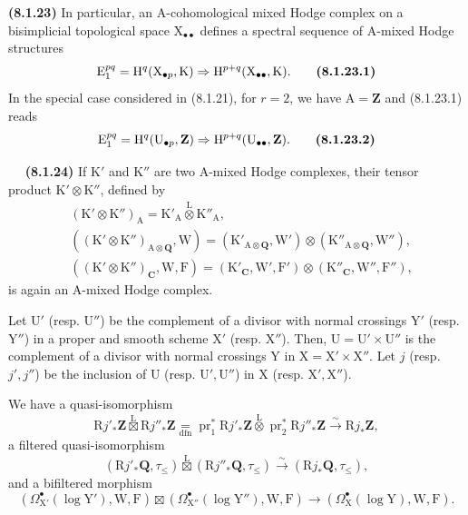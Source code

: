 \documentclass[11pt,leqno]{article}
\newcommand{\Page}[1]{\ifvmode\noindent\else\unskip\ \fi{\footnotesize\textcolor{gray}{[p.\,#1]}}\ \ignorespaces}
\begin{document}
\textbf{(8.1.23)} In particular, an \(\mathrm{A}\)-cohomological mixed Hodge complex on a bisimplicial topological space \(\mathrm{X}_{\bullet\bullet}\) defines a spectral sequence of \(\mathrm{A}\)-mixed Hodge structures
\[
\mathrm{E}_{1}^{pq}
=
\mathrm{H}^{q}(\mathrm{X}_{\bullet p},\mathrm{K})
\Rightarrow
\mathrm{H}^{p+q}(\mathrm{X}_{\bullet\bullet},\mathrm{K}).
\tag*{\textbf{(8.1.23.1)}}
\]
In the special case considered in (8.1.21), for \(r=2\), we have \(\mathrm{A}=\mathbf{Z}\) and (8.1.23.1) reads
\[
\mathrm{E}_{1}^{pq}
=
\mathrm{H}^{q}(\mathrm{U}_{\bullet p},\mathbf{Z})
\Rightarrow
\mathrm{H}^{p+q}(\mathrm{U}_{\bullet\bullet},\mathbf{Z}).
\tag*{\textbf{(8.1.23.2)}}
\]

\Page{37}
\textbf{(8.1.24)} If \(\mathrm{K}'\) and \(\mathrm{K}''\) are two \(\mathrm{A}\)-mixed Hodge complexes, their tensor product \(\mathrm{K}'\otimes\mathrm{K}''\), defined by
\[
\begin{aligned}
&(\mathrm{K}'\otimes\mathrm{K}'')_{\mathrm{A}}
 =\mathrm{K}'_{\mathrm{A}}\overset{\mathrm{L}}{\otimes}\mathrm{K}''_{\mathrm{A}},\\
&((\mathrm{K}'\otimes\mathrm{K}'')_{\mathrm{A}\otimes\mathbf{Q}},\mathrm{W})
 =(\mathrm{K}'_{\mathrm{A}\otimes\mathbf{Q}},\mathrm{W}')
 \otimes(\mathrm{K}''_{\mathrm{A}\otimes\mathbf{Q}},\mathrm{W}''),\\
&((\mathrm{K}'\otimes\mathrm{K}'')_{\mathbf{C}},\mathrm{W},\mathrm{F})
 =(\mathrm{K}'_{\mathbf{C}},\mathrm{W}',\mathrm{F}')
 \otimes(\mathrm{K}''_{\mathbf{C}},\mathrm{W}'',\mathrm{F}''),
\end{aligned}
\]
is again an \(\mathrm{A}\)-mixed Hodge complex.

Let \(\mathrm{U}'\) (resp. \(\mathrm{U}''\)) be the complement of a divisor with normal crossings \(\mathrm{Y}'\) (resp. \(\mathrm{Y}''\)) in a proper and smooth scheme \(\mathrm{X}'\) (resp. \(\mathrm{X}''\)). Then, \(\mathrm{U}=\mathrm{U}'\times\mathrm{U}''\) is the complement of a divisor with normal crossings \(\mathrm{Y}\) in \(\mathrm{X}=\mathrm{X}'\times\mathrm{X}''\). Let \(j\) (resp. \(j',j''\)) be the inclusion of \(\mathrm{U}\) (resp. \(\mathrm{U}',\mathrm{U}''\)) in \(\mathrm{X}\) (resp. \(\mathrm{X}',\mathrm{X}''\)).

We have a quasi-isomorphism
\[
\mathrm{R}j'_*\mathbf{Z}\overset{\mathrm{L}}{\boxtimes}\mathrm{R}j''_*\mathbf{Z}
\underset{\mathrm{dfn}}{=}
\operatorname{pr}_1^*\mathrm{R}j'_*\mathbf{Z}
\overset{\mathrm{L}}{\otimes}
\operatorname{pr}_2^*\mathrm{R}j''_*\mathbf{Z}
\xrightarrow{\sim}\mathrm{R}j_*\mathbf{Z},
\]
a filtered quasi-isomorphism
\[
(\mathrm{R}j'_*\mathbf{Q},\tau_{\leq})
\overset{\mathrm{L}}{\boxtimes}
(\mathrm{R}j''_*\mathbf{Q},\tau_{\leq})
\xrightarrow{\sim}
(\mathrm{R}j_*\mathbf{Q},\tau_{\leq}),
\]
and a bifiltered morphism
\[
(\Omega_{\mathrm{X}'}^\bullet(\log\mathrm{Y}'),\mathrm{W},\mathrm{F})
\boxtimes
(\Omega_{\mathrm{X}''}^\bullet(\log\mathrm{Y}''),\mathrm{W},\mathrm{F})
\longrightarrow
(\Omega_{\mathrm{X}}^\bullet(\log\mathrm{Y}),\mathrm{W},\mathrm{F}).
\]
\end{document}
